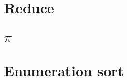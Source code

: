 \chapter{Reduce}

\label{reduce}

\chapter{$\pi$}

\label{pi}

\chapter{Enumeration sort}

\label{enumsort}


